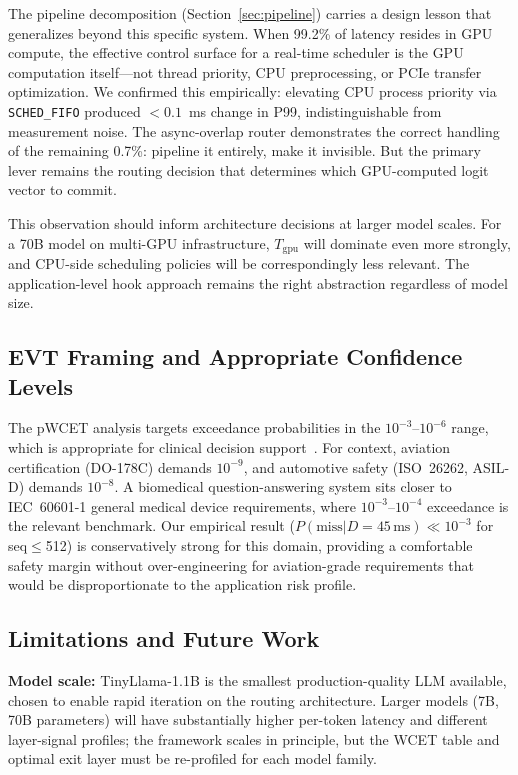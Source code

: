 \documentclass[conference]{IEEEtran}
\begin{document}
The pipeline decomposition (Section~\ref{sec:pipeline}) carries a
design lesson that generalizes beyond this specific system.
When 99.2\% of latency resides in GPU compute, the effective control
surface for a real-time scheduler is the GPU computation itself---not
thread priority, CPU preprocessing, or PCIe transfer optimization.
We confirmed this empirically: elevating CPU process priority via
\texttt{SCHED\_FIFO} produced $<0.1$~ms change in P99, indistinguishable
from measurement noise.
The async-overlap router demonstrates the correct handling of the
remaining 0.7\%: pipeline it entirely, make it invisible.
But the primary lever remains the routing decision that determines
which GPU-computed logit vector to commit.

This observation should inform architecture decisions at larger model
scales.
For a 70B model on multi-GPU infrastructure, $T_{\text{gpu}}$ will
dominate even more strongly, and CPU-side scheduling policies will be
correspondingly less relevant.
The application-level hook approach remains the right abstraction
regardless of model size.

\subsection{EVT Framing and Appropriate Confidence Levels}

The pWCET analysis targets exceedance probabilities in the
$10^{-3}$--$10^{-6}$ range, which is appropriate for clinical decision
support~\cite{singhal2023large}.
For context, aviation certification (DO-178C) demands $10^{-9}$, and
automotive safety (ISO~26262, ASIL-D) demands $10^{-8}$.
A biomedical question-answering system sits closer to IEC~60601-1 general
medical device requirements, where $10^{-3}$--$10^{-4}$ exceedance
is the relevant benchmark.
Our empirical result ($P(\text{miss}|D{=}45\,\text{ms}) \ll 10^{-3}$
for seq$\leq$512) is conservatively strong for this domain, providing
a comfortable safety margin without over-engineering for aviation-grade
requirements that would be disproportionate to the application risk profile.

\subsection{Limitations and Future Work}

\textbf{Model scale:}
TinyLlama-1.1B is the smallest production-quality LLM available, chosen
to enable rapid iteration on the routing architecture.
Larger models (7B, 70B parameters) will have substantially higher
per-token latency and different layer-signal profiles; the framework
scales in principle, but the WCET table and optimal exit layer must be
re-profiled for each model family.
\end{document}
